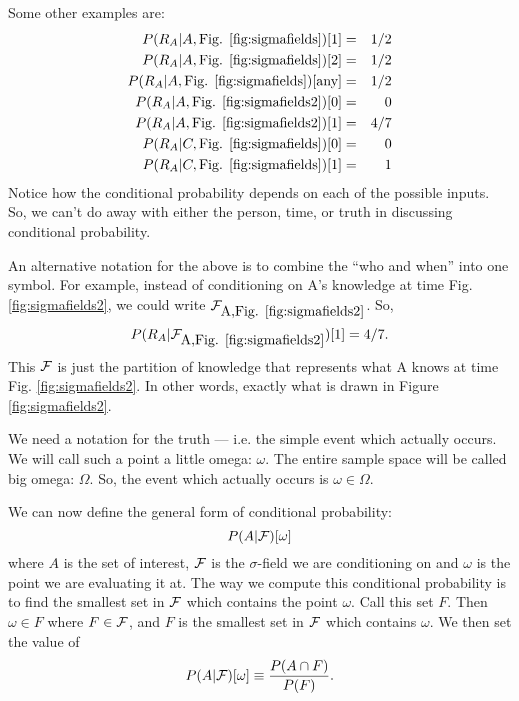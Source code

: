 \documentclass[14pt]{extarticle}
\begin{document}
Some other examples are:
\begin{eqnarray*}
P(R_A | A,\hbox{Fig. \ref{fig:sigmafields}})[1] &=&
1/2 \\
P(R_A | A,\hbox{Fig. \ref{fig:sigmafields}})[2] &=&
1/2 \\
P(R_A | A,\hbox{Fig. \ref{fig:sigmafields}})[\hbox{any}] &=&
1/2 \\
P(R_A | A,\hbox{Fig. \ref{fig:sigmafields2}})[0] &=&
0 \\
P(R_A | A,\hbox{Fig. \ref{fig:sigmafields2}})[1] &=&
4/7 \\
P(R_A | C,\hbox{Fig. \ref{fig:sigmafields}})[0] &=&
0 \\
P(R_A | C,\hbox{Fig. \ref{fig:sigmafields}})[1] &=&
1
\end{eqnarray*}
Notice how the conditional probability depends on each of the possible
inputs.  So, we can't do away with either the person, time, or truth
in discussing conditional probability.

An alternative notation for the above is to combine the ``who and
when'' into one symbol.  For example, instead of conditioning on A's
knowledge at time Fig. \ref{fig:sigmafields2}, we could write ${\cal
  F}_{\hbox{A,Fig. \ref{fig:sigmafields2}}}$.  So, 
\begin{displaymath}
P(R_A|{\cal  F}_{\hbox{A,Fig. \ref{fig:sigmafields2}}})[1] =  4/7.
\end{displaymath}
This ${\cal F}$ is just the partition of knowledge that represents
what A knows at time Fig. \ref{fig:sigmafields2}. In other words,
exactly what is drawn in Figure \ref{fig:sigmafields2}.

We need a notation for the truth --- i.e. the simple event which actually
occurs.  We will call such a point a little omega:
$\omega$.\label{def:little_omega} The entire sample space will be
called big omega: $\Omega$. \label{def:sample_space} So, the event
which actually occurs is $\omega \in \Omega$.

We can now define the general form of conditional probability:
\begin{displaymath}
P(A|{\cal F})[\omega]
\end{displaymath}
where $A$ is the set of interest, ${\cal F}$ is the $\sigma$-field we
are conditioning on and $\omega$ is the point we are evaluating it at.
The way we compute this conditional probability is to find the
smallest set in ${\cal F}$ which contains the point $\omega$.  Call
this set $F$.  Then $\omega \in F$ where $F \in {\cal F}$, and $F$ is
the smallest set in ${\cal F}$ which contains $\omega$.  We then set
the value of
\begin{displaymath}
P(A|{\cal F})[\omega] \equiv \frac{P(A \cap F)}{P(F)}.
\end{displaymath}
\end{document}
